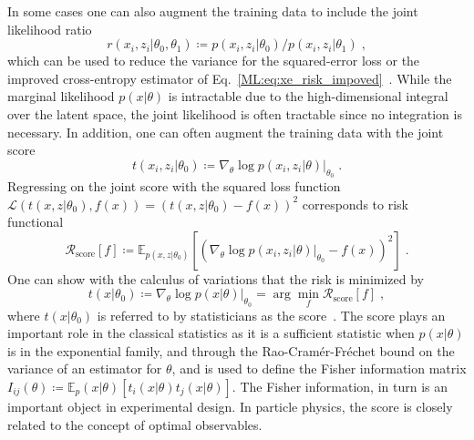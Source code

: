 In some cases one can also augment the training data to include the joint likelihood ratio
\begin{equation}
    \label{ML:eq:joint_ratio}
    r(x_i, z_i | \theta_0, \theta_1) \coloneqq p(x_i,z_i|\theta_0)/p(x_i,z_i|\theta_1)  \;,
\end{equation}
which can be used to reduce the variance for the squared-error loss or the improved cross-entropy estimator of Eq.~\ref{ML:eq:xe_risk_impoved}~\cite{Brehmer:2018hga,Stoye:2018ovl}. While the marginal likelihood $p(x|\theta)$ is intractable due to the high-dimensional integral over the latent space, the joint likelihood is often tractable since no integration is necessary. In addition, one can often augment the training data with the joint score
\begin{equation}
t(x_i, z_i | \theta_0) \coloneqq \nabla_\theta \log p(x_i,z_i|\theta) \vert_{\theta_0} \;.
\end{equation}
Regressing on the joint score with the squared loss function $\mathcal{L}(t(x,z| \theta_0), f(x)) = (t(x,z| \theta_0)-f(x))^2$ corresponds to risk functional
\begin{equation}
\mathcal{R}_\textrm{score}[f] \coloneq \mathbb{E}_{p(x,z|\theta_0)} [ (\nabla_\theta \log p(x_i,z_i|\theta)\vert_{\theta_0} - f(x))^2 ]  \; .
\end{equation}
One can show with the calculus of variations that the risk is minimized by
\begin{equation}
t(x|\theta_0) \coloneqq \nabla_\theta \log p(x|\theta) \vert_{\theta_0} = \arg \min_f \mathcal{R}_\textrm{score}[f]    \; ,
\end{equation}
where $t(x|\theta_0)$ is referred to by statisticians as the score~\cite{Brehmer:2018hga}. The score plays an important role in the classical statistics as it is a sufficient statistic when $p(x|\theta)$ is in the exponential family, and through the Rao-Cram\'er-Fr\'echet bound on the variance of an estimator for $\theta$, and is used to define the Fisher information matrix $I_{ij}(\theta) \coloneqq \mathbb{E}_p(x|\theta)[t_i(x|\theta) t_j(x|\theta)]$. The Fisher information, in turn is an important object in experimental design. In particle physics, the score is closely related to the concept of optimal observables. 


